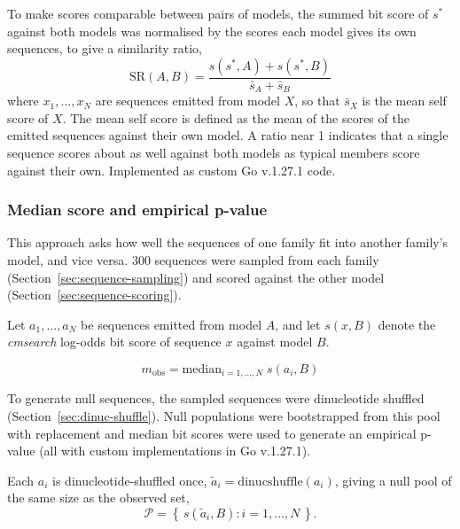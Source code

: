 To make scores comparable between pairs of models, the summed bit score of $s^{*}$ against both models was normalised by the scores each model gives its own sequences, to give a similarity ratio,
\begin{equation}
  \label{eq:similarity-ratio}
  \mathrm{SR}(A, B) = \frac{s(s^{*}, A) + s(s^{*}, B)}{\bar{s}_{A} + \bar{s}_{B}}
\end{equation}
where $x_1,\dots,x_N$ are sequences emitted from model $X$, so that $\bar{s}_{X}$ is the mean self score of $X$.
The mean self score is defined as the mean of the scores of the emitted sequences against their own model.
A ratio near 1 indicates that a single sequence scores about as well against both models as typical members score against their own.
Implemented as custom Go v.1.27.1 code.

\subsubsection{Median score and empirical p-value}
\label{subsubsec:median-score}

This approach asks how well the sequences of one family fit into another family's model, and vice versa.
300 sequences were sampled from each family (Section~\ref{sec:sequence-sampling}) and scored against the other model (Section~\ref{sec:sequence-scoring}).

Let $a_1,\dots,a_N$ be sequences emitted from model $A$, and let $s(x, B)$ denote the \emph{cmsearch} log-odds bit score of sequence $x$ against model $B$.

\begin{equation}
  \label{eq:m-obs}
  m_{\mathrm{obs}} = \mathrm{median}_{i=1,\dots,N}\; s(a_i, B)
\end{equation}

To generate null sequences, the sampled sequences were dinucleotide shuffled (Section~\ref{sec:dinuc-shuffle}).
Null populations were bootstrapped from this pool with replacement and median bit scores were used to generate an empirical p-value (all with custom implementations in Go v.1.27.1).

Each $a_i$ is dinucleotide-shuffled once, $\tilde{a}_i = \mathrm{dinucshuffle}(a_i)$, giving a null pool of the same size as the observed set,
\begin{equation}
  \label{eq:null-pool}
  \mathcal{P} = \left\{\, s(\tilde{a}_i, B) : i = 1,\dots,N \,\right\}.
\end{equation}

